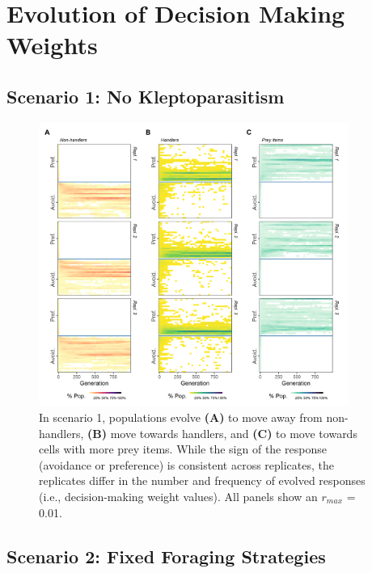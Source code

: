 \documentclass[11pt]{article}
\begin{document}
\newpage

\section{Evolution of Decision Making Weights}

\subsection{Scenario 1: No Kleptoparasitism}

\begin{figure}[h!]
        \centering
        \includegraphics*[width=0.9\textwidth]{figures/fig_wt_evo_foragers.png}
        \caption{In scenario 1, populations evolve \textbf{(A)} to move away from non-handlers, \textbf{(B)} move towards handlers, and \textbf{(C)} to move towards cells with more prey items.
        While the sign of the response (avoidance or preference) is consistent across replicates, the replicates differ in the number and frequency of evolved responses (i.e., decision-making weight values).
        All panels show an $r_{max}$ = 0.01.}
\end{figure}

\newpage

\subsection{Scenario 2: Fixed Foraging Strategies}
\end{document}
